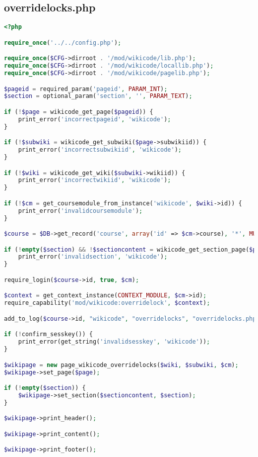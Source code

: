 \subsection{overridelocks.php}
\begin{lstlisting}[language=PHP]
<?php

require_once('../../config.php');

require_once($CFG->dirroot . '/mod/wikicode/lib.php');
require_once($CFG->dirroot . '/mod/wikicode/locallib.php');
require_once($CFG->dirroot . '/mod/wikicode/pagelib.php');

$pageid = required_param('pageid', PARAM_INT);
$section = optional_param('section', '', PARAM_TEXT);

if (!$page = wikicode_get_page($pageid)) {
    print_error('incorrectpageid', 'wikicode');
}

if (!$subwiki = wikicode_get_subwiki($page->subwikiid)) {
    print_error('incorrectsubwikiid', 'wikicode');
}

if (!$wiki = wikicode_get_wiki($subwiki->wikiid)) {
    print_error('incorrectwikiid', 'wikicode');
}

if (!$cm = get_coursemodule_from_instance('wikicode', $wiki->id)) {
    print_error('invalidcoursemodule');
}

$course = $DB->get_record('course', array('id' => $cm->course), '*', MUST_EXIST);

if (!empty($section) && !$sectioncontent = wikicode_get_section_page($page, $section)) {
    print_error('invalidsection', 'wikicode');
}

require_login($course->id, true, $cm);

$context = get_context_instance(CONTEXT_MODULE, $cm->id);
require_capability('mod/wikicode:overridelock', $context);

add_to_log($course->id, "wikicode", "overridelocks", "overridelocks.php?id=$cm->id", "$wiki->id");

if (!confirm_sesskey()) {
    print_error(get_string('invalidsesskey', 'wikicode'));
}

$wikipage = new page_wikicode_overridelocks($wiki, $subwiki, $cm);
$wikipage->set_page($page);

if (!empty($section)) {
    $wikipage->set_section($sectioncontent, $section);
}

$wikipage->print_header();

$wikipage->print_content();

$wikipage->print_footer();
\end{lstlisting}

